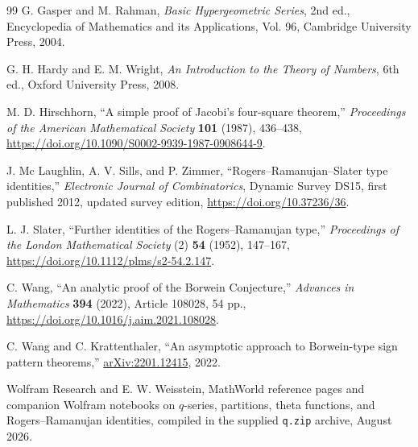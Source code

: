 \documentclass[11pt,oneside]{article}
\theoremstyle{definition}
\begin{document}
\begin{thebibliography}{99}
G. Gasper and M. Rahman,
\emph{Basic Hypergeometric Series}, 2nd ed.,
Encyclopedia of Mathematics and its Applications, Vol. 96,
Cambridge University Press, 2004.

G. H. Hardy and E. M. Wright,
\emph{An Introduction to the Theory of Numbers}, 6th ed.,
Oxford University Press, 2008.

M. D. Hirschhorn,
``A simple proof of Jacobi's four-square theorem,''
\emph{Proceedings of the American Mathematical Society}
\textbf{101} (1987), 436--438,
\url{https://doi.org/10.1090/S0002-9939-1987-0908644-9}.

J. Mc Laughlin, A. V. Sills, and P. Zimmer,
``Rogers--Ramanujan--Slater type identities,''
\emph{Electronic Journal of Combinatorics}, Dynamic Survey DS15,
first published 2012, updated survey edition,
\url{https://doi.org/10.37236/36}.

L. J. Slater,
``Further identities of the Rogers--Ramanujan type,''
\emph{Proceedings of the London Mathematical Society} (2)
\textbf{54} (1952), 147--167,
\url{https://doi.org/10.1112/plms/s2-54.2.147}.

C. Wang,
``An analytic proof of the Borwein Conjecture,''
\emph{Advances in Mathematics} \textbf{394} (2022), Article 108028,
54 pp.,
\url{https://doi.org/10.1016/j.aim.2021.108028}.

C. Wang and C. Krattenthaler,
``An asymptotic approach to Borwein-type sign pattern theorems,''
\href{https://arxiv.org/abs/2201.12415}{arXiv:2201.12415}, 2022.

Wolfram Research and E. W. Weisstein,
MathWorld reference pages and companion Wolfram notebooks on $q$-series,
partitions, theta functions, and Rogers--Ramanujan identities,
compiled in the supplied \nolinkurl{q.zip} archive, August 2026.

\end{thebibliography}
\end{document}
